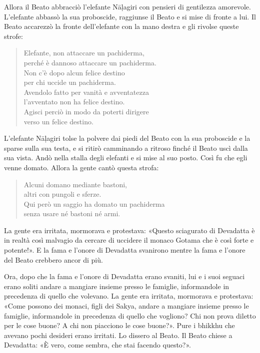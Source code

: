 Allora il Beato abbracciò l’elefante Nāḷagiri con pensieri di gentilezza
amorevole. L’elefante abbassò la sua proboscide, raggiunse il Beato e si
mise di fronte a lui. Il Beato accarezzò la fronte dell’elefante con la
mano destra e gli rivolse queste strofe:


\begin{quote}
Elefante, non attaccare un pachiderma, \\
perché è dannoso attaccare un pachiderma. \\
Non c’è dopo alcun felice destino \\
per chi uccide un pachiderma. \\
Avendolo fatto per vanità e avventatezza \\
l’avventato non ha felice destino. \\
Agisci perciò in modo da poterti dirigere \\
verso un felice destino.
\end{quote}

L’elefante Nāḷagiri tolse la polvere dai piedi del Beato con la sua
proboscide e la sparse sulla sua testa, e si ritirò camminando a ritroso
finché il Beato uscì dalla sua vista. Andò nella stalla degli elefanti e
si mise al suo posto. Così fu che egli venne domato. Allora la gente
cantò questa strofa:


\begin{quote}
Alcuni domano mediante bastoni, \\
altri con pungoli e sferze. \\
Qui però un saggio ha domato un pachiderma \\
senza usare né bastoni né armi.
\end{quote}

La gente era irritata, mormorava e protestava: «Questo sciagurato di
Devadatta è in realtà così malvagio da cercare di uccidere il monaco
Gotama che è così forte e potente!». E la fama e l’onore di Devadatta
svanirono mentre la fama e l’onore del Beato crebbero ancor di più.




Ora, dopo che la fama e l’onore di Devadatta erano svaniti, lui e i suoi
seguaci erano soliti andare a mangiare insieme presso le famiglie,
informandole in precedenza di quello che volevano. La gente era
irritata, mormorava e protestava: «Come possono dei monaci, figli dei
Sakya, andare a mangiare insieme presso le famiglie, informandole in
precedenza di quello che vogliono? Chi non prova diletto per le cose
buone? A chi non piacciono le cose buone?». Pure i bhikkhu che avevano
pochi desideri erano irritati. Lo dissero al Beato. Il Beato chiese a
Devadatta: «È vero, come sembra, che stai facendo questo?».


